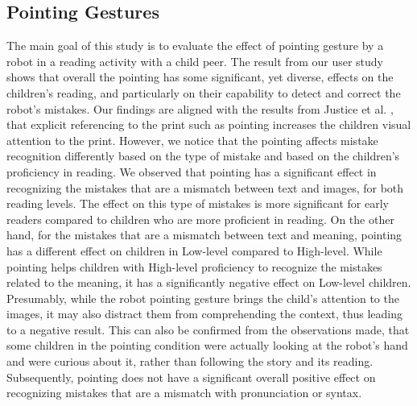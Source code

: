 \documentclass{sigchi}
\begin{document}
\subsection{Pointing Gestures}
The main goal of this study is to evaluate the effect of pointing gesture by a robot in a reading activity with a child peer. 
The result from our user study shows that overall the pointing has some significant, yet diverse, effects on the children's reading, and particularly on their capability to detect and correct the robot's mistakes. 
Our findings are aligned with the results from Justice et al. \cite{justice2008influence}, that explicit referencing to the print such as pointing increases the children visual attention to the print.
However, we notice that the pointing affects mistake recognition differently based on the type of mistake and based on the children's proficiency in reading.
We observed that pointing has a significant effect in recognizing the mistakes that are a mismatch between text and images, for both reading levels. 
The effect on this type of mistakes is more significant for early readers compared to children who are more proficient in reading. 
On the other hand, for the mistakes that are a mismatch between text and meaning, pointing has a different effect on children in Low-level compared to High-level.
While pointing helps children with High-level proficiency to recognize the mistakes related to the meaning, it has a significantly negative effect on Low-level children.
Presumably, while the robot pointing gesture brings the child's attention to the images, it may also distract them from comprehending the context, thus leading to a negative result. 
This can also be confirmed from the observations made, that some children in the pointing condition were actually looking at the robot's hand and were curious about it, rather than following the story and its reading.
Subsequently, pointing does not have a significant overall positive effect on recognizing mistakes that are a mismatch with pronunciation or syntax.
\end{document}
